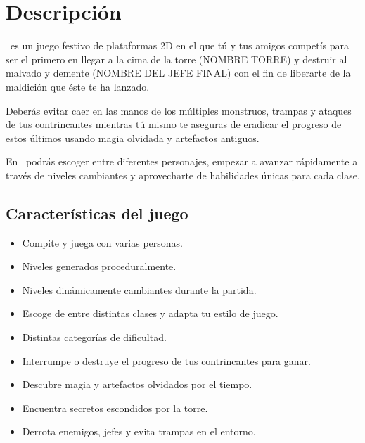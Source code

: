 \justifying
\thispagestyle{fancy}
\fancyhf{}
\renewcommand{\headrulewidth}{0.5pt}
\fancyhead[R]{\small\slshape\thepage}
\frenchspacing
{}

\setlength{\parindent}{0cm} %
\setlength{\parskip}{1.5ex plus 0.5ex minus 0.5ex}   %

\setlength\headheight{15pt}
\section{Descripción}

\izenburua\ es un juego festivo de plataformas 2D en el que tú y tus amigos competís
para ser el primero en llegar a la cima de la torre (NOMBRE TORRE) y destruir al
malvado y demente (NOMBRE DEL JEFE FINAL) con el fin de liberarte de la
maldición que éste te ha lanzado.

Deberás evitar caer en las manos de los múltiples monstruos, trampas y ataques
de tus contrincantes mientras tú mismo te aseguras de eradicar el progreso de
estos últimos usando magia olvidada y artefactos antiguos.

En \izenburua\ podrás escoger entre diferentes personajes, empezar a
avanzar rápidamente a través de niveles cambiantes y aprovecharte de habilidades
únicas para cada clase.

\subsection{Características del juego}

\begin{itemize}
    \item Compite y juega con varias personas.
    \item Niveles generados proceduralmente.
    \item Niveles dinámicamente cambiantes durante la partida.
    \item Escoge de entre distintas clases y adapta tu estilo de juego.
    \item Distintas categorías de dificultad.
    \item Interrumpe o destruye el progreso de tus contrincantes para ganar.
    \item Descubre magia y artefactos olvidados por el tiempo.
    \item Encuentra secretos escondidos por la torre.
    \item Derrota enemigos, jefes y evita trampas en el entorno.
\end{itemize}

